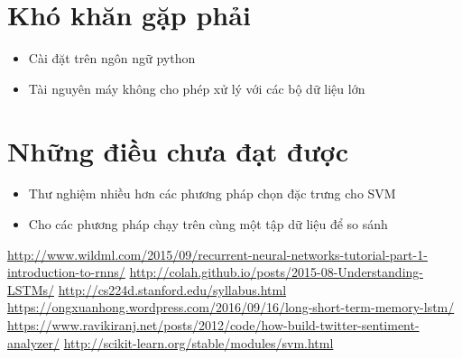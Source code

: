 \documentclass[a4paper,12pt]{report}
\begin{document}
\section{Khó khăn gặp phải}
\begin{itemize}
\item Cài đặt trên ngôn ngữ python
\item Tài nguyên máy không cho phép xử lý với các bộ dữ liệu lớn

\end{itemize}
\section{Những điều chưa đạt được}
\begin{itemize}
\item Thư nghiệm nhiều hơn các phương pháp chọn đặc trưng cho SVM
\item Cho các phương pháp chạy trên cùng một tập dữ liệu để so sánh 
\end{itemize}

\begin{thebibliography}{9}
 \url{http://www.wildml.com/2015/09/recurrent-neural-networks-tutorial-part-1-introduction-to-rnns/}
 \url{http://colah.github.io/posts/2015-08-Understanding-LSTMs/}
 \url{http://cs224d.stanford.edu/syllabus.html}
 \url{https://ongxuanhong.wordpress.com/2016/09/16/long-short-term-memory-lstm/}
 \url{https://www.ravikiranj.net/posts/2012/code/how-build-twitter-sentiment-analyzer/}
 \url{http://scikit-learn.org/stable/modules/svm.html}
\end{thebibliography}
\end{document}
